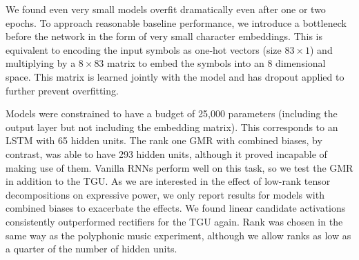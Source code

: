 We found even very small models overfit dramatically even after one or two epochs. To approach
reasonable baseline performance, we introduce a bottleneck before the network in the form of very
small character embeddings. This is equivalent to encoding the input symbols as one-hot vectors
(size \(83 \times 1\)) and multiplying by a \(8 \times 83\) matrix to embed the symbols into an
8 dimensional space. This matrix is learned jointly with the model and has dropout 
\autocite{Srivastava2014} applied to further prevent overfitting.

Models were constrained to have a budget of 25,000 parameters (including the output layer but
not including the embedding matrix). This corresponds to
an LSTM with 65 hidden units. The rank one GMR with combined 
biases, by contrast,
was able to have 293 hidden units, although it proved incapable of making use of them. Vanilla RNNs
perform well on this task, so we test the GMR in addition to the TGU. As we are interested
in the effect of low-rank tensor decompositions on expressive power, we only report results for models
with combined biases to exacerbate the effects.
We found linear candidate activations consistently outperformed rectifiers for
the TGU again.
Rank was chosen in the same way as the polyphonic music experiment, although we allow ranks as low as
a quarter of the number of hidden units.

